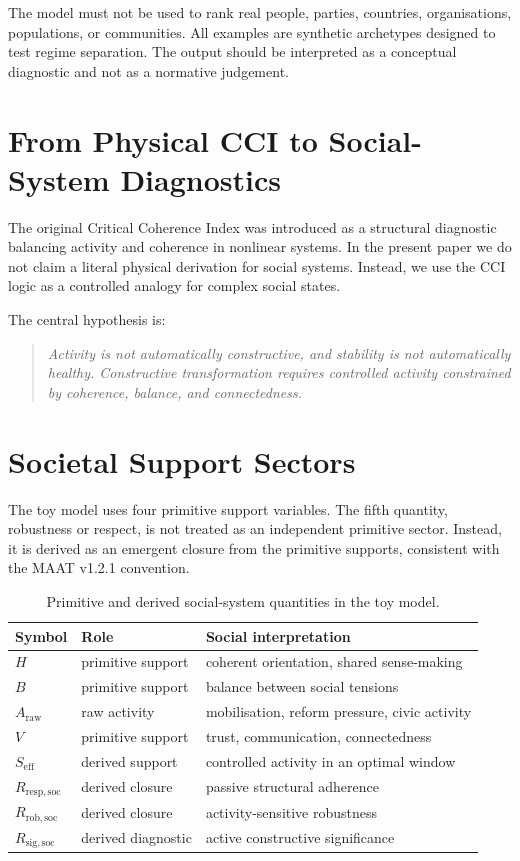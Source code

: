 \documentclass[11pt,a4paper]{article}
\newcommand{\Seff}{S_{\mathrm{eff}}}
\newcommand{\Rresp}{R_{\mathrm{resp,soc}}}
\newcommand{\Rrob}{R_{\mathrm{rob,soc}}}
\newcommand{\Rsig}{R_{\mathrm{sig,soc}}}
\begin{document}
The model must not be used to rank real people, parties, countries,
organisations, populations, or communities.
All examples are synthetic archetypes designed to test regime separation.
The output should be interpreted as a conceptual diagnostic and not as a
normative judgement.

\section{From Physical CCI to Social-System Diagnostics}

The original Critical Coherence Index was introduced as a structural
diagnostic balancing activity and coherence in nonlinear systems.
In the present paper we do not claim a literal physical derivation for social
systems.
Instead, we use the CCI logic as a controlled analogy for complex social
states.

The central hypothesis is:
\begin{quote}
\emph{Activity is not automatically constructive, and stability is not
automatically healthy. Constructive transformation requires controlled
activity constrained by coherence, balance, and connectedness.}
\end{quote}

\section{Societal Support Sectors}

The toy model uses four primitive support variables.
The fifth quantity, robustness or respect, is not treated as an independent
primitive sector.
Instead, it is derived as an emergent closure from the primitive supports,
consistent with the MAAT v1.2.1 convention.

\begin{table}[H]
\centering
\caption{Primitive and derived social-system quantities in the toy model.}
\begin{tabular}{lll}
\toprule
\textbf{Symbol} & \textbf{Role} & \textbf{Social interpretation} \\
\midrule
$H$ & primitive support & coherent orientation, shared sense-making \\
$B$ & primitive support & balance between social tensions \\
$A_{\mathrm{raw}}$ & raw activity & mobilisation, reform pressure, civic activity \\
$V$ & primitive support & trust, communication, connectedness \\
$\Seff$ & derived support & controlled activity in an optimal window \\
$\Rresp$ & derived closure & passive structural adherence \\
$\Rrob$ & derived closure & activity-sensitive robustness \\
$\Rsig$ & derived diagnostic & active constructive significance \\
\bottomrule
\end{tabular}
\end{table}
\end{document}
